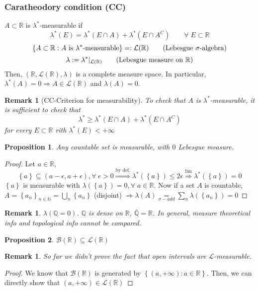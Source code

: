 \documentclass[a4paper,12pt]{article}
\theoremstyle{break}
\newtheorem{proposition}{Proposition}[section]
\newtheorem{remark}[section]{Remark}
\newcommand{\sigalg}{\sigma\mbox{-algebra}}
\newcommand{\boreal}{\mathcal{B}(\mathbb{R})}
\newcommand{\real}{\mathbb{R}}
\numberwithin{equation}{section}
\begin{document}
\subsubsection*{Caratheodory condition (CC)}
\(A \subset \real\) is \(\lambda^*\)-measurable if 
\[
    \lambda^*(E) = \lambda^*(E \cap A) + \lambda^*(E \cap A^C) \qquad \forall \; E \subset \real
\]
\[
    \left\lbrace A \subset \real : A \mbox{ is }\lambda^*\mbox{-measurable} \right\rbrace =: \mathcal{L}(\real)
\tag*{(Lebesgue \(\sigalg\))}\]
\[
    \lambda := \lambda^* \vert_{\mathcal{L}(\real)}
\tag*{(Lebesgue measure on \(\real\))}\]
Then, \((\real, \mathcal{L}(\real), \lambda)\) is a complete measure space. In particular, \(\lambda^*(A) = 0 \Longrightarrow A \in \mathcal{L}(\real)\) and \(\lambda(A) = 0\).
\begin{remark}[CC-Criterion for measurability]
    To check that \(A\) is \(\lambda^*\)-measurable, it is sufficient to check that 
    \[
        \lambda^* \geq \lambda^*(E \cap A) + \lambda^*(E \cap A^C)
    \] for every \(E \subset \real\) rith \(\lambda^*(E) < +\infty\)
\end{remark}
\begin{proposition}
    Any countable set is measurable, with \(0\) Lebesgue measure.
\end{proposition}
\begin{proof}
    Let \(a \in \real\), \[\left\lbrace a \right\rbrace \subseteq (a-\epsilon, a+\epsilon), \forall \; \epsilon > 0 \overset{\mbox{by def.}}{\Longrightarrow} \lambda^*(\left\lbrace a \right\rbrace) \leq 2\epsilon \overset{\mbox{lim}}{\Longrightarrow} \lambda^*(\left\lbrace a \right\rbrace) = 0\]
    \(\left\lbrace a \right\rbrace\) is measurable with \(\lambda(\left\lbrace a \right\rbrace) = 0, \forall \; a \in \real\). Now if a set \(A\) is countable, \(A = \left\lbrace a_n \right\rbrace_{n \in \mathbb{N}} = \bigcup_n \left\lbrace a_n \right\rbrace\) (disjoint) \(\Longrightarrow \lambda(A) \underset{\sigma-add}{=} \sum_n \lambda(\left\lbrace a_n \right\rbrace) = 0\)
\end{proof}
\begin{remark}
    \(\lambda(\mathbb{Q} = 0)\). \(\mathbb{Q}\) is dense on \(\real\), \(\bar{\mathbb{Q}} = \real\). In general, measure theoretical info and topological info cannot be compared.
\end{remark}
\begin{proposition}
    \(\boreal \subseteq \mathcal{L}(\real)\)
\end{proposition}
\begin{remark}
    So far we didn't prove the fact that open intervals are \(\mathcal{L}\)-measurable.
\end{remark}
\begin{proof}
    We know that \(\boreal\) is generated by \(\left\lbrace (a, +\infty) : a \in \real \right\rbrace\). Then, we can directly show that \((a, +\infty) \in \mathcal{L}(\real)\)
\end{proof}
\end{document}
